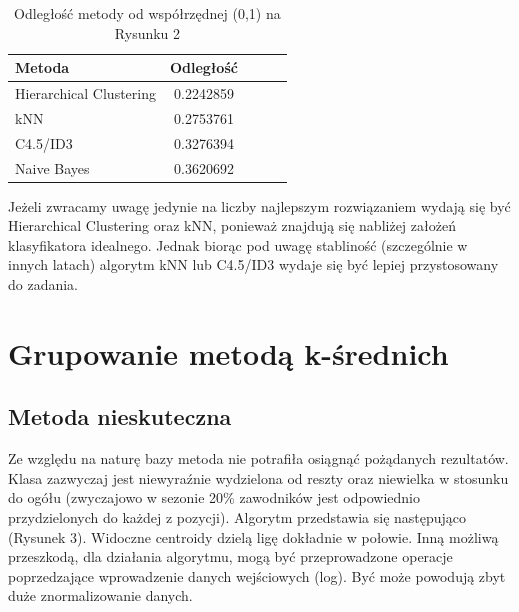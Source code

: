 \documentclass[twoside,twocolumn]{article}
\begin{document}
\begin{table}[hbt!]
\centering
\caption{Odległość metody od współrzędnej (0,1) na Rysunku 2}
\begin{tabular}{l*{4}{c}}
Metoda & Odległość \\
\hline
Hierarchical Clustering & 0.2242859 \\
kNN & 0.2753761 \\
C4.5/ID3 & 0.3276394 \\
Naive Bayes & 0.3620692 \\
\end{tabular}
\end{table}
\newpage
\indent Jeżeli zwracamy uwagę jedynie na liczby najlepszym rozwiązaniem wydają się być Hierarchical Clustering oraz kNN, ponieważ znajdują się nabliżej założeń klasyfikatora idealnego. Jednak biorąc pod uwagę stabliność (szczególnie w innych latach) algorytm kNN lub C4.5/ID3 wydaje się być lepiej przystosowany do zadania.


\section{Grupowanie metodą k-średnich}

\subsection{Metoda nieskuteczna}

\indent Ze względu na naturę bazy metoda nie potrafiła osiągnąć pożądanych rezultatów. Klasa zazwyczaj jest niewyraźnie wydzielona od reszty oraz niewielka w stosunku do ogółu (zwyczajowo w sezonie 20\% zawodników jest odpowiednio przydzielonych do każdej z pozycji). Algorytm przedstawia się następująco (Rysunek 3). Widoczne centroidy dzielą ligę dokładnie w połowie. Inną możliwą przeszkodą, dla działania algorytmu, mogą być przeprowadzone operacje poprzedzające wprowadzenie danych wejściowych (log). Być może powodują zbyt duże znormalizowanie danych.
\end{document}
